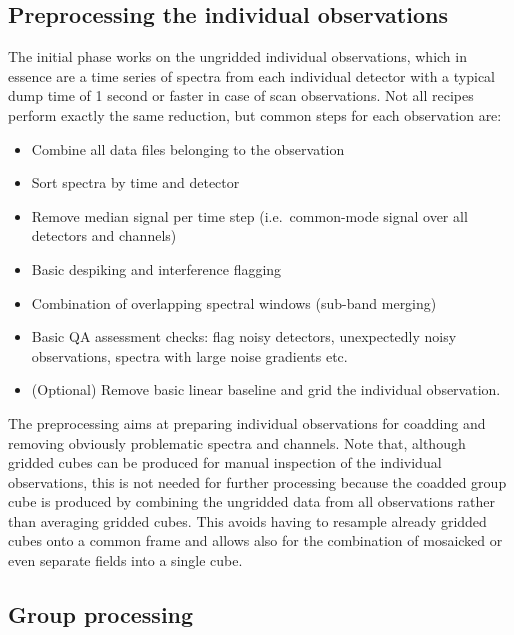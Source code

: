 \documentclass[useAMS,usenatbib]{mn2e}
\begin{document}
\subsection{Preprocessing the individual observations}

The initial phase works on the ungridded individual observations,
which in essence are a time series of spectra from each individual
detector with a typical dump time of 1 second or faster in case of scan
observations.  Not all recipes perform exactly the same reduction, but
common steps for each observation are:
\begin{itemize}
\item Combine all data files belonging to the observation
\item Sort spectra by time and detector
\item Remove median signal per time step (i.e.\ common-mode signal over
all detectors and channels)
\item Basic despiking and interference flagging
\item Combination of overlapping spectral windows (sub-band merging)
\item Basic QA assessment checks: flag noisy detectors, unexpectedly noisy
observations, spectra with large noise gradients etc.
\item (Optional) Remove basic linear baseline and grid the individual
observation.
\end{itemize}

The preprocessing aims at preparing individual observations for
coadding and removing obviously problematic spectra and channels.
Note that, although gridded cubes can be produced for manual
inspection of the individual observations, this is not needed for
further processing because the coadded group cube is produced by
combining the ungridded data from all observations rather than
averaging gridded cubes.  This avoids having to resample already
gridded cubes onto a common frame and allows also for the combination
of mosaicked or even separate fields into a single cube.

\subsection{Group processing}
\end{document}
